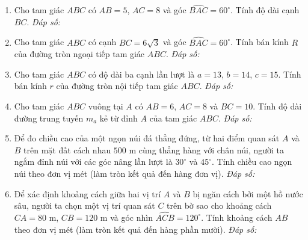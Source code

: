 \documentclass[12pt,a4paper]{article}
\newcommand{\answerbox}{\hfill\textit{Đáp số:}\ \fbox{\rule{0pt}{9pt}\hspace{2.2cm}}}
\begin{document}
\begin{enumerate}[resume]
\item Cho tam giác $ABC$ có $AB = 5$, $AC = 8$ và góc $\widehat{BAC} = 60^\circ$. Tính độ dài cạnh $BC$.
\answerbox

\item Cho tam giác $ABC$ có cạnh $BC = 6\sqrt{3}$ và góc $\widehat{BAC} = 60^\circ$. Tính bán kính $R$ của đường tròn ngoại tiếp tam giác $ABC$.
\answerbox

\item Cho tam giác $ABC$ có độ dài ba cạnh lần lượt là $a = 13$, $b = 14$, $c = 15$. Tính bán kính $r$ của đường tròn nội tiếp tam giác $ABC$.
\answerbox

\item Cho tam giác $ABC$ vuông tại $A$ có $AB = 6$, $AC = 8$ và $BC = 10$. Tính độ dài đường trung tuyến $m_a$ kẻ từ đỉnh $A$ của tam giác $ABC$.
\answerbox

\item Để đo chiều cao của một ngọn núi đá thẳng đứng, từ hai điểm quan sát $A$ và $B$ trên mặt đất cách nhau $500\text{ m}$ cùng thẳng hàng với chân núi, người ta ngắm đỉnh núi với các góc nâng lần lượt là $30^\circ$ và $45^\circ$. Tính chiều cao ngọn núi theo đơn vị mét (làm tròn kết quả đến hàng đơn vị).
\answerbox

\item Để xác định khoảng cách giữa hai vị trí $A$ và $B$ bị ngăn cách bởi một hồ nước sâu, người ta chọn một vị trí quan sát $C$ trên bờ sao cho khoảng cách $CA = 80\text{ m}$, $CB = 120\text{ m}$ và góc nhìn $\widehat{ACB} = 120^\circ$. Tính khoảng cách $AB$ theo đơn vị mét (làm tròn kết quả đến hàng phần mười).
\answerbox
\end{enumerate}

\newpage
\end{document}

